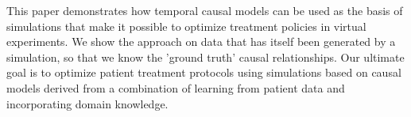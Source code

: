 

This paper demonstrates how temporal causal models can be used as the basis of simulations that make it possible to optimize treatment policies in virtual experiments. We show the approach on data that has itself been generated by a simulation, so that we know the 'ground truth' causal relationships. Our ultimate goal is to optimize patient treatment protocols using simulations based on causal models derived from a combination of learning from patient data and incorporating domain knowledge.





